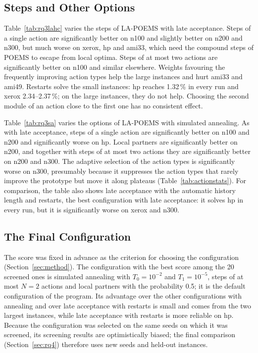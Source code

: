 

\subsection{Steps and Other Options}

Table~\ref{tab:rq3lahc} varies the steps of LA-POEMS with late acceptance. Steps of a single action are significantly better on n100 and slightly better on n200 and n300, but much worse on xerox, hp and ami33, which need the compound steps of POEMS to escape from local optima. Steps of at most two actions are significantly better on n100 and similar elsewhere. Weights favouring the frequently improving action types help the large instances and hurt ami33 and ami49. Restarts solve the small instances: hp reaches 1.32\,\% in every run and xerox 2.34--2.37\,\%; on the large instances, they do not help. Choosing the second module of an action close to the first one has no consistent effect.



Table~\ref{tab:rq3sa} varies the options of LA-POEMS with simulated annealing. As with late acceptance, steps of a single action are significantly better on n100 and n200 and significantly worse on hp. Local partners are significantly better on n200, and together with steps of at most two actions they are significantly better on n200 and n300. The adaptive selection of the action types is significantly worse on n300, presumably because it suppresses the action types that rarely improve the prototype but move it along plateaus (Table~\ref{tab:actionstats}). For comparison, the table also shows late acceptance with the automatic history length and restarts, the best configuration with late acceptance: it solves hp in every run, but it is significantly worse on xerox and n300.



\subsection{The Final Configuration}

The score was fixed in advance as the criterion for choosing the configuration (Section~\ref{sec:method}). The configuration with the best score among the 20 screened ones is simulated annealing with $T_0 = 10^{-2}$ and $T_1 = 10^{-5}$, steps of at most $N = 2$ actions and local partners with the probability 0.5; it is the default configuration of the program. Its advantage over the other configurations with annealing and over late acceptance with restarts is small and comes from the two largest instances, while late acceptance with restarts is more reliable on hp. Because the configuration was selected on the same seeds on which it was screened, its screening results are optimistically biased; the final comparison (Section~\ref{sec:rq4}) therefore uses new seeds and held-out instances.

